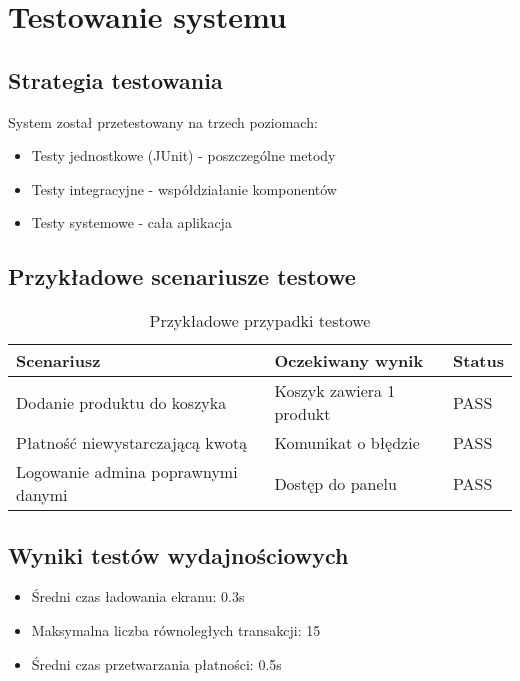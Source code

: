 \section{Testowanie systemu}
\subsection{Strategia testowania}
System został przetestowany na trzech poziomach:
\begin{itemize}
\item Testy jednostkowe (JUnit) - poszczególne metody
\item Testy integracyjne - współdziałanie komponentów
\item Testy systemowe - cała aplikacja
\end{itemize}

\subsection{Przykładowe scenariusze testowe}
\begin{table}[H]
\centering
\caption{Przykładowe przypadki testowe}
\begin{tabular}{|l|l|l|}
\hline
\textbf{Scenariusz} & \textbf{Oczekiwany wynik} & \textbf{Status} \\ \hline
Dodanie produktu do koszyka & Koszyk zawiera 1 produkt & PASS \\ \hline
Płatność niewystarczającą kwotą & Komunikat o błędzie & PASS \\ \hline
Logowanie admina poprawnymi danymi & Dostęp do panelu & PASS \\ \hline
\end{tabular}
\end{table}

\subsection{Wyniki testów wydajnościowych}
\begin{itemize}
\item Średni czas ładowania ekranu: 0.3s
\item Maksymalna liczba równoległych transakcji: 15
\item Średni czas przetwarzania płatności: 0.5s
\end{itemize}